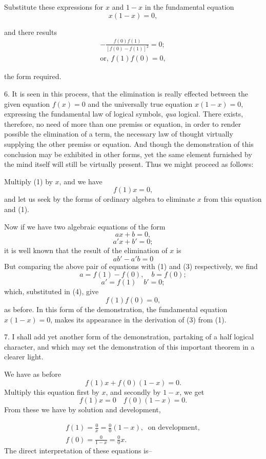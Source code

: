 \documentclass[oneside]{book}
\begin{document}
Substitute these expressions for $x$ and $1-x$ in the fundamental
equation
\[
x(1-x) = 0,
\]

and there results
\begin{eqnarray}
-\frac{f(0)f(1)}{[f(0)-f(1)]^2}=0; \nonumber\\
\textrm{or, }f(1)f(0)=0,
\end{eqnarray}

the form required.

6. It is seen in this process, that the elimination is really effected
between the given equation $f(x)=0$ and the universally true
equation $x(1-x)=0$, expressing the fundamental law of logical
symbols, \textit{qua} logical. There exists, therefore, no need of more
than one premiss or equation, in order to render possible the elimination
of a term, the necessary law of thought virtually supplying
the other premiss or equation. And though the demonstration
of this conclusion may be exhibited in other forms, yet
the same element furnished by the mind itself will still be virtually
present. Thus we might proceed as follows:

Multiply (1) by $x$, and we have
\begin{equation}
f(1)x=0,
\end{equation}
and let us seek by the forms of ordinary algebra to eliminate $x$
from this equation and (1).

Now if we have two algebraic equations of the form
\[
ax + b = 0,
\]
\[
a'x + b'= 0;
\]
it is well known that the result of the elimination of $x$ is
\begin{equation}
ab'-a'b=0
\end{equation}
But comparing the above pair of equations with (1) and (3)
respectively, we find
\[
a=f(1)-f(0),\quad b=f(0);
\]
\[
a'=f(1) \quad b'=0;
\]
which, substituted in (4), give
\[
f(1)f(0)=0,
\]
as before. In this form of the demonstration, the fundamental
equation $x(1 - x) = 0$, makes its appearance in the derivation of
(3) from (1).

7. I shall add yet another form of the demonstration, partaking
of a half logical character, and which may set the demonstration
of this important theorem in a clearer light.

We have as before
\[
f(1)x+f(0)(1-x)=0.
\]
Multiply this equation first by $x$, and secondly by $1 - x$, we get
\[
f(1)x=0 \quad f(0)(1-x)=0.
\]
From these we have by solution and development,

\begin{eqnarray*}
     f(1) = \frac{0}{x}
          = \frac{0}{0}(1-x),\:\textrm{ on development},\\
     f(0) = \frac{0}{1-x}
          = \frac{0}{0}x.
\end{eqnarray*}
The direct interpretation of these equations is--
\end{document}
